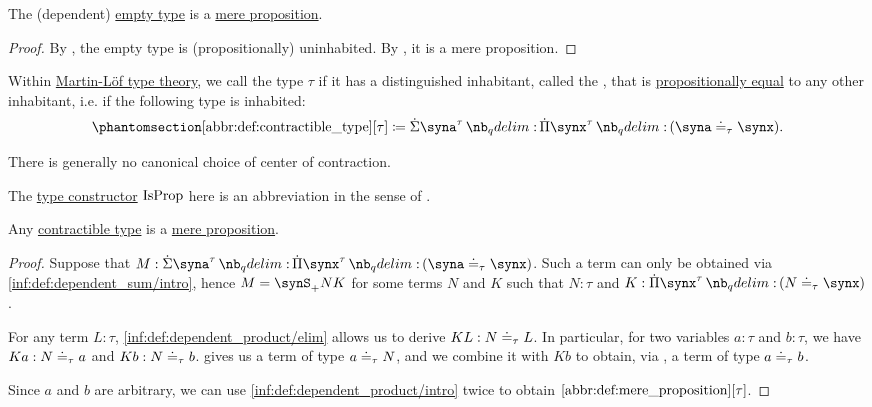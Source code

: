 \begin{corollary}\label{thm:empty_type_is_proposition}
  The (dependent) \hyperref[def:dependent_empty_type]{empty type} is a \hyperref[def:mere_proposition]{mere proposition}.
\end{corollary}
\begin{proof}
  By , the empty type is (propositionally) uninhabited. By , it is a mere proposition.
\end{proof}

\begin{definition}\label{def:contractible_type}
  Within \hyperref[def:mltt]{Martin-L\"of type theory}, we call the type \( \tau \)  if it has a distinguished inhabitant, called the , that is \hyperref[def:mltt_propositional_equality]{propositionally equal} to any other inhabitant, i.e. if the following type is inhabited:
  \begin{equation*}\taglabel[\op{IsContr}]{abbr:def:contractible_type}
    \ref{abbr:def:contractible_type}[\tau] \coloneqq \qsum {\syna^\tau} \qprod {\synx^\tau} (\syna \syneq_\tau \synx).
  \end{equation*}
\end{definition}
\begin{comments}
  \item There is generally no canonical choice of center of contraction.

  \item The \hyperref[con:type_constructor]{type constructor} \( \op{IsProp} \) here is an abbreviation in the sense of .
\end{comments}

\begin{proposition}\label{thm:contractible_type_is_proposition}
  Any \hyperref[def:contractible_type]{contractible type} is a \hyperref[def:mere_proposition]{mere proposition}.
\end{proposition}
\begin{proof}
  Suppose that \( M: \qsum {\syna^\tau} \qprod {\synx^\tau} (\syna \syneq_\tau \synx) \). Such a term can only be obtained via \ref{inf:def:dependent_sum/intro}, hence \( M = \synS_+ N K \) for some terms \( N \) and \( K \) such that \( N: \tau \) and \( K: \qprod {\synx^\tau} (N \syneq_\tau \synx) \).

  For any term \( L: \tau \), \ref{inf:def:dependent_product/elim} allows us to derive \( KL: N \doteq_\tau L \). In particular, for two variables \( a: \tau \) and \( b: \tau \), we have \( Ka: N \doteq_\tau a \) and \( Kb: N \doteq_\tau b \).  gives us a term of type \( a \doteq_\tau N \), and we combine it with \( Kb \) to obtain, via , a term of type \( a \doteq_\tau b \).

  Since \( a \) and \( b \) are arbitrary, we can use \ref{inf:def:dependent_product/intro} twice to obtain \( \ref{abbr:def:mere_proposition}[\tau] \).
\end{proof}

